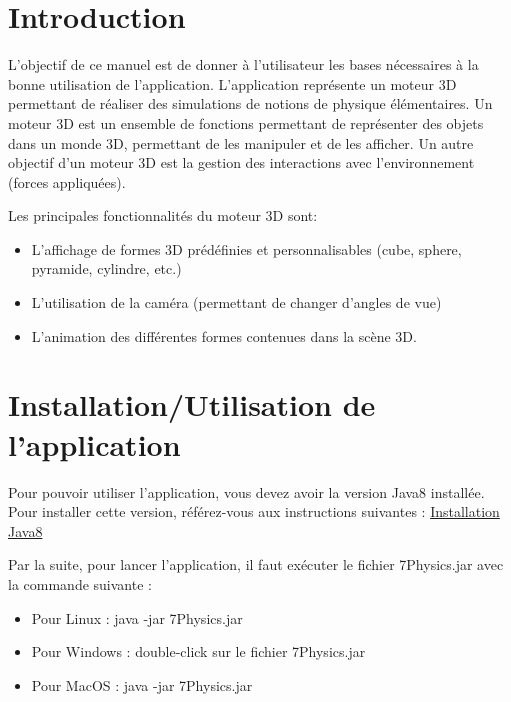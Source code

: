 \documentclass[11pt]{report}
\begin{document}


\tableofcontents

\chapter{Introduction}
L'objectif de ce manuel est de donner à l'utilisateur les bases nécessaires à la bonne utilisation de l'application.
L'application représente un moteur 3D permettant de réaliser des simulations de notions de physique élémentaires.
Un moteur 3D est un ensemble de fonctions permettant de représenter des objets dans un monde 3D, permettant de les
manipuler et de les afficher. Un autre objectif d'un moteur 3D est la gestion des interactions avec l'environnement (forces appliquées). \newline \newline


Les principales fonctionnalités du moteur 3D sont:
\begin{itemize}
        \item L'affichage de formes 3D prédéfinies et personnalisables (cube, sphere, pyramide, cylindre, etc.)
        \item L'utilisation de la caméra (permettant de changer d'angles de vue)
        \item L'animation des différentes formes contenues dans la scène 3D.
\end{itemize}

\chapter{Installation/Utilisation de l'application}

Pour pouvoir utiliser l'application, vous devez avoir la version Java8 installée.
Pour installer cette version, référez-vous aux instructions suivantes : \href{https://docs.oracle.com/javase/8/docs/technotes/guides/install/install_overview.html}{\color{blue}Installation Java8}\newline

Par la suite, pour lancer l'application, il faut exécuter le fichier 7Physics.jar avec la commande suivante :
\begin{itemize}
  \item Pour Linux : java -jar 7Physics.jar
  \item Pour Windows : double-click sur le fichier 7Physics.jar
  \item Pour MacOS : java -jar 7Physics.jar\newline
\end{itemize}
\end{document}
